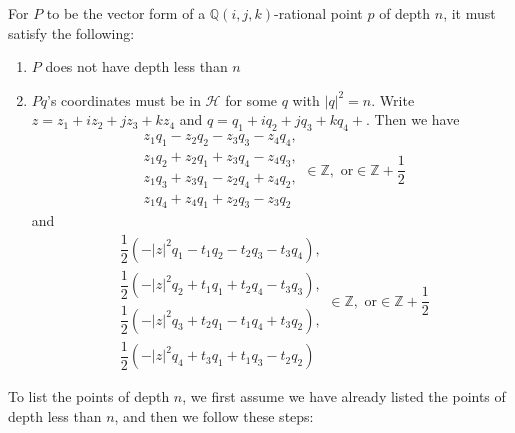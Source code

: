 \documentclass{article}[12pt]
\newcommand{\Z}{\mathbb{Z}}
\newcommand{\Q}{\mathbb{Q}}
\begin{document}
For $P$ to be the vector form of a $\Q(i,j,k)$-rational point $p$ of depth $n$, it must satisfy the following:
\begin{enumerate}
\item $P$ does not have depth less than $n$ 
\item $Pq$'s coordinates must be in $\mathcal{H}$ for some $q$ with $|q|^2 = n$.  Write $z = z_1+iz_2+jz_3+kz_4$ and $q=q_1+iq_2+jq_3+kq_4+$.  Then we have
\begin{equation}\label{coordszq}
\begin{array}{c}
z_1q_1-z_2q_2-z_3q_3-z_4q_4,\\
z_1q_2+z_2q_1+z_3q_4-z_4q_3,\\
z_1q_3+z_3q_1-z_2q_4+z_4q_2,\\
z_1q_4+z_4q_1+z_2q_3-z_3q_2
\end{array} \in \Z,\text{ or}\in\Z+\frac{1}{2}
\end{equation}
and
\begin{equation}\label{coordsvertq}
\begin{array}{c}
\dfrac{1}{2}(-|z|^2q_1-t_1q_2-t_2q_3-t_3q_4),\\
\dfrac{1}{2}(-|z|^2q_2+t_1q_1+t_2q_4-t_3q_3),\\
\dfrac{1}{2}(-|z|^2q_3+t_2q_1-t_1q_4+t_3q_2),\\
\dfrac{1}{2}(-|z|^2q_4+t_3q_1+t_1q_3-t_2q_2)
\end{array} \in \Z,\text{ or}\in\Z+\frac{1}{2}
\end{equation}

\end{enumerate}
To list the points of depth $n$, we first assume we have already listed the points of depth less than $n$, and then we follow these steps:
\end{document}
